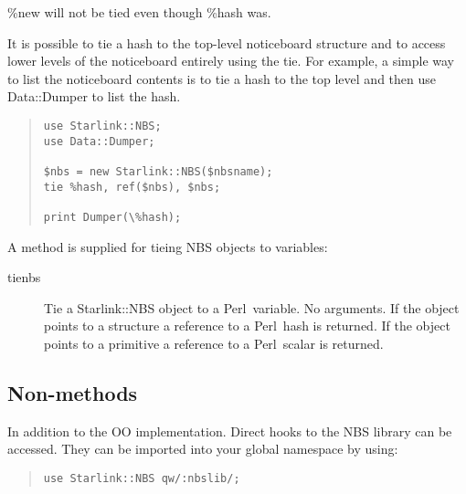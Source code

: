 \documentclass[twoside,11pt]{article}
\newenvironment{myquote}{\begin{quote}\begin{small}}{\end{small}\end{quote}}
\newcommand{\perl}{\xref{\textsf{Perl}}{sun193}{}}
\newcommand{\xref}[3]{#1}
\renewcommand{\_}{\texttt{\symbol{95}}}
\begin{document}
\%new will not be tied even though \%hash was.

It is possible to tie a hash to the top-level noticeboard structure
and to access lower levels of the noticeboard entirely using the
tie. For example, a simple way to list the noticeboard contents
is to tie a hash to the top level and then use Data::Dumper to
list the hash.
\begin{myquote}
\begin{verbatim}
use Starlink::NBS;
use Data::Dumper;

$nbs = new Starlink::NBS($nbsname);
tie %hash, ref($nbs), $nbs;

print Dumper(\%hash);  
\end{verbatim}
\end{myquote}

A method is supplied for tieing NBS objects to variables:

\begin{description}

\item[tienbs] \mbox{}

Tie a Starlink::NBS object to a \perl\ variable. No arguments.  If the
object points to a structure a reference to a \perl\ hash is returned.
If the object points to a primitive a reference to a \perl\ scalar is
returned.

\end{description}

\subsection{Non-methods}%

In addition to the OO implementation. Direct hooks to the NBS library
can be accessed. They can be imported into your global namespace by
using:
\begin{myquote}
\begin{verbatim}
use Starlink::NBS qw/:nbslib/;
\end{verbatim}
\end{myquote}
\end{document}
